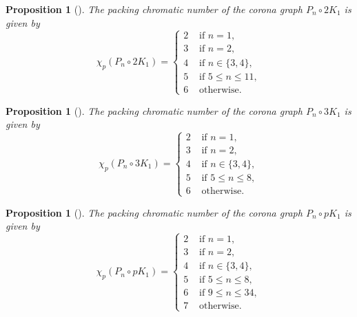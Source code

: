 \documentclass{article}
\newtheorem{definition}{Definition}
\newtheorem{prop}[theorem]{Proposition}
\begin{document}
\begin{prop}[\cite{laiche2017packing}]
The packing chromatic number of the corona  graph $P_n \circ 2K_1$ is given
 by
$$
\chi_p(P_n \circ 2K_1)=
\left\{
\begin{array}{ll}
2 & \text{ if } n=1,\\
3 & \text{ if } n=2,\\
4 & \text{ if } n\in \{3,4\},\\
5 & \text{ if } 5 \leq n \leq 11,\\
6 & \text{ otherwise.}
\end{array}\right.
$$
\end{prop}

\begin{prop}[\cite{laiche2017packing}]
The packing chromatic number of the corona  graph $P_n \circ 3K_1$ is given by $$\chi_p(P_n \circ 3K_1)=
\left\{
\begin{array}{ll}
2 & \text{ if } n=1,\\
3 & \text{ if } n=2,\\
4 & \text{ if } n\in \{3,4\},\\
5 & \text{ if } 5 \leq n \leq 8,\\
6 & \text{ otherwise.}
\end{array}\right.
$$
\end{prop}

\begin{prop}[\cite{laiche2017packing}]
    The packing chromatic number of the corona  graph $P_n \circ pK_1$ is given
 by
$$\chi_p(P_n \circ pK_1)=
\left\{
\begin{array}{ll}
2 & \text{ if } n=1,\\
3 & \text{ if } n=2,\\
4 & \text{ if } n\in \{3,4\},\\
5 & \text{ if } 5 \leq n \leq 8,\\
6 & \text{ if } 9 \leq n \leq 34,\\
7 & \text{ otherwise.}
\end{array}\right.
$$\label{prop:cater}
\end{prop}


\end{document}
